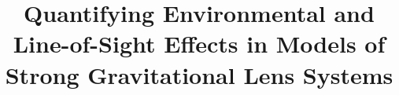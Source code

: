 \title[Environmental and LOS Effects in Lens Models]
{Quantifying Environmental and Line-of-Sight Effects in Models of Strong Gravitational Lens Systems}
  
  